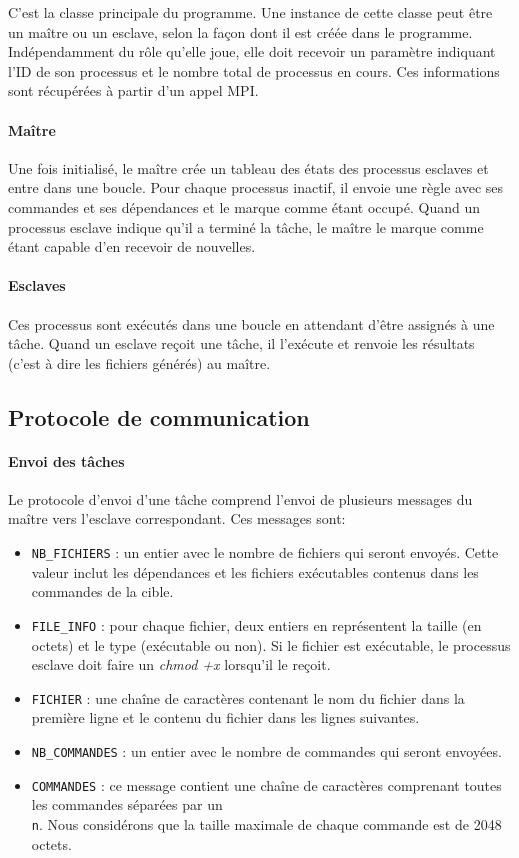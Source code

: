 \documentclass[a4paper,12pt,twoside]{article}
\begin{document}
C'est la classe principale du programme. Une instance de cette classe
peut être un maître ou un esclave, selon la façon dont il est créée
dans le programme. Indépendamment du rôle qu'elle joue, elle doit
recevoir un paramètre indiquant l'ID de son processus et le nombre
total de processus en cours. Ces informations sont récupérées à partir
d'un appel MPI. 

\paragraph{Maître}

Une fois initialisé, le maître crée un tableau des états des
processus esclaves et entre dans une boucle. Pour chaque processus
inactif, il envoie une règle avec ses commandes et ses dépendances et
le marque comme étant occupé. Quand un processus esclave indique qu'il a terminé la tâche,
le maître le marque comme étant capable d'en recevoir de nouvelles.

\paragraph{Esclaves}

Ces processus sont exécutés dans une boucle en attendant d'être assignés
à une tâche. Quand un esclave reçoit une tâche, il l'exécute et
renvoie les résultats (c'est à dire les fichiers générés) au maître.

\subsection{Protocole de communication}

\paragraph{Envoi des tâches}
Le protocole d'envoi d'une tâche comprend l'envoi de plusieurs
messages du maître vers l'esclave correspondant. Ces messages sont:
\begin{itemize}
\item \texttt{NB\_FICHIERS} : un entier avec le nombre de fichiers qui seront envoyés. Cette valeur inclut les dépendances et les fichiers exécutables contenus dans les commandes de la cible.
\item \texttt{FILE\_INFO} : pour chaque fichier, deux entiers en représentent la taille  (en octets) et le type (exécutable ou non). Si le fichier est exécutable, le processus esclave doit faire un \emph{chmod +x} lorsqu'il le reçoit.
\item \texttt{FICHIER} : une chaîne de caractères contenant le nom du
  fichier dans la première ligne et le contenu du fichier dans les lignes suivantes.
\item \texttt{NB\_COMMANDES} : un entier avec le nombre de commandes qui seront envoyées.
\item \texttt{COMMANDES} : ce message contient une chaîne de
  caractères comprenant toutes les commandes séparées par un
  \texttt{\\n}. Nous considérons que la taille maximale de chaque
  commande est de 2048 octets. 
\end{itemize}
\end{document}
